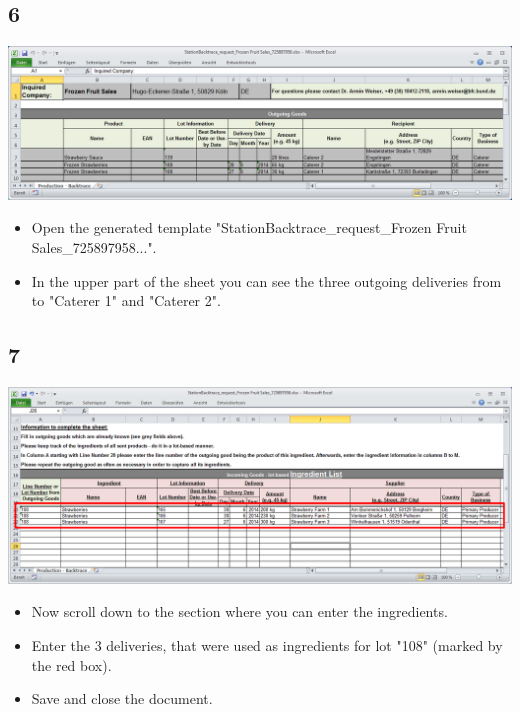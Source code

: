 \documentclass{beamer}
\begin{document}
\subsection{6}
\begin{frame}
	\begin{center}
  		\includegraphics[height=0.3\textheight]{6.png}
	\end{center}
	\begin{itemize}
		\item Open the generated template "StationBacktrace\_request\_Frozen Fruit Sales\_725897958...".
		\item In the upper part of the sheet you can see the three outgoing deliveries from to "Caterer 1" and "Caterer 2".
	\end{itemize}
\end{frame}

\subsection{7}
\begin{frame}
	\begin{center}
  		\includegraphics[height=0.4\textheight]{7.png}
	\end{center}
	\begin{itemize}
		\item Now scroll down to the section where you can enter the ingredients.
		\item Enter the 3 deliveries, that were used as ingredients for lot "108" (marked by the red box).
		\item Save and close the document.
	\end{itemize}
\end{frame}
\end{document}
